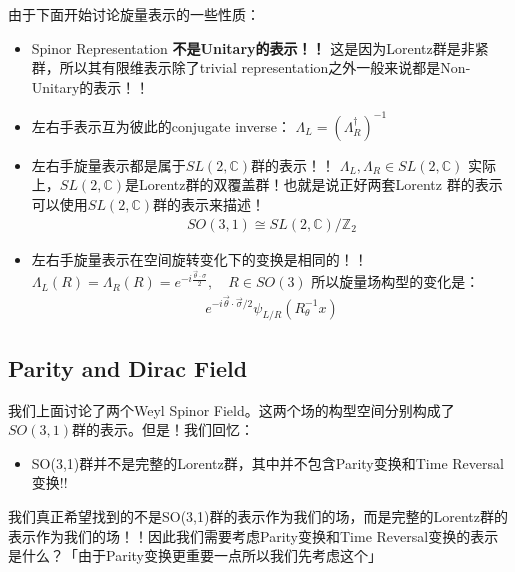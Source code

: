     由于下面开始讨论旋量表示的一些性质：
    \begin{itemize}
      \item Spinor Representation \textbf{不是Unitary的表示！！}
        这是因为Lorentz群是非紧群，所以其有限维表示除了trivial
        representation之外一般来说都是Non-Unitary的表示！！
      \item 左右手表示互为彼此的conjugate inverse：
        $ \Lambda_L=\left(\Lambda_R^\dagger\right)^{-1}$
      \item 左右手旋量表示都是属于$ SL(2,\mathbb{C}) $群的表示！！
        $ \Lambda_L,\Lambda_R\in SL(2,\mathbb{C}) $
        实际上，$ SL(2,\mathbb{C}) $是Lorentz群的双覆盖群！也就是说正好两套Lorentz
        群的表示可以使用$ SL(2,\mathbb{C}) $群的表示来描述！
        \begin{align}
          SO(3,1)\cong SL(2,\mathbb{C})/\mathbb{Z}_2
        \end{align}
      \item 左右手旋量表示在空间旋转变化下的变换是相同的！！
        $
        \Lambda_L(R)=\Lambda_R(R)=e^{-i\frac{\vec{\theta}\cdot\sigma}{2}},\quad
        R\in SO(3)$
        所以旋量场构型的变化是：
        \begin{align}
          e^{-i\vec{\theta}\cdot\vec{\sigma}/2}\psi_{L/R}(R_\theta^{-1}x)
        \end{align}
    \end{itemize}

    \subsection{Parity and Dirac Field}


    我们上面讨论了两个Weyl Spinor Field。这两个场的构型空间分别构成了$ SO(3,1) $群的表示。但是！我们回忆：
    \begin{itemize}
      \item SO(3,1)群并不是完整的Lorentz群，其中并不包含Parity变换和Time Reversal变换!!
    \end{itemize}
    我们真正希望找到的不是SO(3,1)群的表示作为我们的场，而是完整的Lorentz群的表示作为我们的场！！因此我们需要考虑Parity变换和Time
    Reversal变换的表示是什么？「由于Parity变换更重要一点所以我们先考虑这个」

